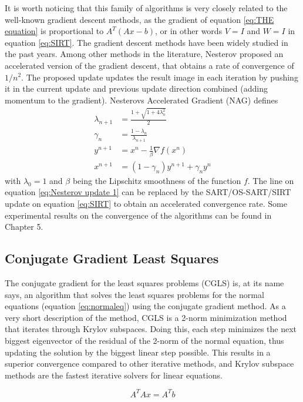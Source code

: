 It is worth noticing that this family of algorithms is very closely related to the well-known gradient descent methods, as the gradient of equation \ref{eq:THE equation} is  proportional to $A^T(Ax-b)$, or in other words $V=I$ and $W=I$ in equation \ref{eq:SIRT}. The gradient descent methods have been widely studied in the past years\cite{sutskever2013importance}\cite{DBLP:journals/corr/Ruder16}. Among other methods in the literature, Nesterov proposed an accelerated version of the gradient descent\cite{nesterov1983method}, that obtains a rate of convergence of $1/n^2$. The proposed update updates the result image in each iteration by pushing it in the current update and previous update direction combined (adding momentum to the gradient). Nesterovs Accelerated Gradient (NAG) defines
\begin{align}
\lambda_{n+1}&=\frac{1+\sqrt{1+4\lambda_{n}^2}}{2}\\
\gamma_n&=\frac{1-\lambda_n}{\lambda_{n+1}}\\
y^{n+1}&=x^{n}-\frac{1}{\beta}\nabla f(x^n)\label{eq:Nesterov update 1}\\ 
x^{n+1}&=(1-\gamma_n)y^{n+1}+\gamma_n y^n
\end{align}
with $\lambda_0=1$ and $\beta$ being the Lipschitz smoothness of the function $f$. The line on equation \ref{eq:Nesterov update 1} can be replaced by the SART/OS-SART/SIRT update on equation \ref{eq:SIRT} to obtain an accelerated convergence rate. Some experimental results on the convergence of the algorithms can be found in Chapter 5.
\subsection{Conjugate Gradient Least Squares}

The conjugate gradient for the least squares problems (CGLS) is, at its name says, an algorithm that solves the least squares problems for the normal equations (equation \ref{eq:normaleq}) using the conjugate gradient method. As a very short description of the method, CGLS is a 2-norm minimization method that iterates through Krylov subspaces. Doing this, each step minimizes the next biggest eigenvector of the residual of the 2-norm of the normal equation, thus updating the solution by the biggest linear step possible. This results in a superior convergence compared to other iterative methods\cite{liesen2004convergence}, and Krylov subspace methods are the fastest iterative solvers for linear equations. 

\begin{equation}
A^TAx=A^Tb \label{eq:normaleq}
\end{equation}

